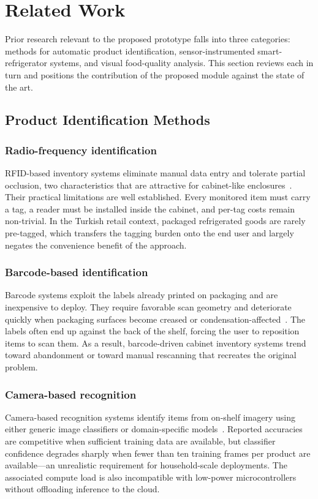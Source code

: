 \section{Related Work}
\label{sec:relatedwork}

Prior research relevant to the proposed prototype falls into three
categories: methods for automatic product identification,
sensor-instrumented smart-refrigerator systems, and visual
food-quality analysis. This section reviews each in turn and
positions the contribution of the proposed module against the state
of the art.

\subsection{Product Identification Methods}

\subsubsection{Radio-frequency identification}
RFID-based inventory systems eliminate manual data entry and tolerate
partial occlusion, two characteristics that are attractive for
cabinet-like enclosures~\cite{abhiram2025iotmonitor}. Their practical
limitations are well established. Every monitored item must carry a
tag, a reader must be installed inside the cabinet, and per-tag costs
remain non-trivial. In the Turkish retail context, packaged
refrigerated goods are rarely pre-tagged, which transfers the tagging
burden onto the end user and largely negates the convenience benefit
of the approach.

\subsubsection{Barcode-based identification}
Barcode systems exploit the labels already printed on packaging and
are inexpensive to deploy. They require favorable scan geometry and
deteriorate quickly when packaging surfaces become creased or
condensation-affected~\cite{pelobello2026chickout}. The labels often
end up against the back of the shelf, forcing the user to reposition
items to scan them. As a result, barcode-driven cabinet inventory
systems trend toward abandonment or toward manual rescanning that
recreates the original problem.

\subsubsection{Camera-based recognition}
Camera-based recognition systems identify items from on-shelf imagery
using either generic image classifiers or domain-specific
models~\cite{ericyang2022smartfridge,vadlamudi2025fridgesense}.
Reported accuracies are competitive when sufficient training data are
available, but classifier confidence degrades sharply when fewer than
ten training frames per product are available---an unrealistic
requirement for household-scale deployments. The associated compute
load is also incompatible with low-power microcontrollers without
offloading inference to the cloud.

